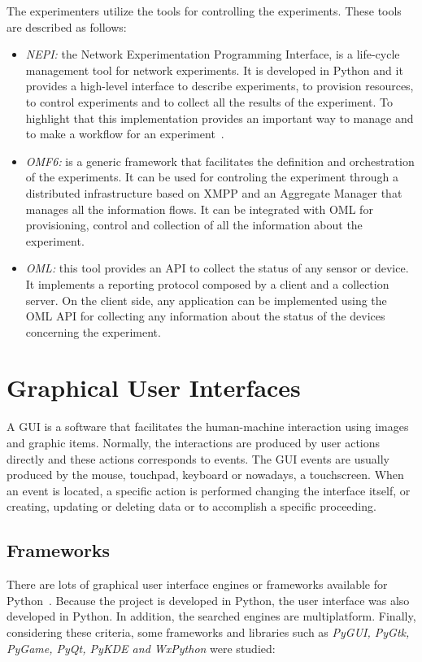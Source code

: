 The experimenters utilize the tools for controlling the experiments. These tools
are described as follows:
\begin{itemize}
\item \emph{NEPI:} the Network Experimentation Programming Interface, is a
  life-cycle management tool for network experiments. It is developed in Python
  and it provides a high-level interface to describe experiments, to provision
  resources, to control experiments and to collect all the results of the
  experiment. To highlight that this implementation provides an important way to
  manage and to make a workflow for an experiment~\cite{INRIA2014}.
\item \emph{\ac{OMF6}:} is a generic framework that facilitates the definition and
  orchestration of the experiments. It can be used for controling the experiment
    through a distributed infrastructure based on \ac{XMPP} and an Aggregate Manager
  that manages all the information flows. It can be integrated with \acs{OML} for
  provisioning, control and collection of all the information about the experiment.
\item \emph{\acf{OML}:} this tool provides an \ac{API} to collect
  the status of any sensor or device. It implements a reporting protocol
  composed by a client and a collection server. On the client side,
  any application can be implemented using the \ac{OML} \ac{API} for collecting any
  information about the status of the devices concerning the experiment.
\end{itemize}


\section{Graphical User Interfaces}

A \ac{GUI} is a software that facilitates the human-machine interaction using images and graphic items. Normally, the interactions are produced
by user actions directly and these actions corresponds to events. The \ac{GUI} events
are usually produced by the mouse, touchpad, keyboard or nowadays, a
touchscreen. When an event is located, a specific action is performed
changing the interface itself, or creating, updating or deleting data or to
accomplish a specific proceeding.


\subsection{Frameworks}

There are lots of graphical user interface engines or frameworks available for
Python~\cite{Athanasias2014}. Because the project is developed in Python, the user interface was also
developed in Python. In addition, the searched engines are multiplatform. Finally, considering these criteria, some frameworks and
libraries  such as \emph{PyGUI, PyGtk, PyGame, PyQt, PyKDE and WxPython} were studied:

